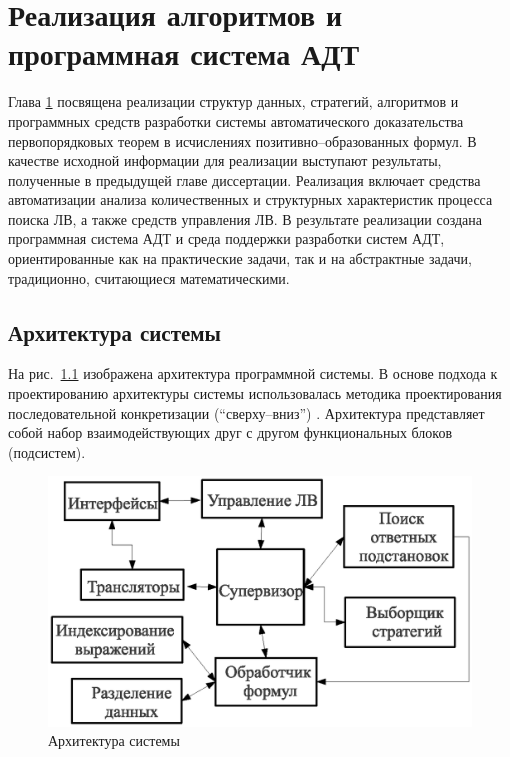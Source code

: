 \chapter{Реализация алгоритмов и программная система АДТ}\label{part:three}

Глава \ref{part:three} посвящена реализации структур данных, стратегий, алгоритмов и программных средств разработки системы автоматического доказательства первопорядковых теорем в исчислениях позитивно--образованных формул. В качестве исходной информации для реализации выступают результаты, полученные в предыдущей главе диссертации. Реализация включает средства автоматизации анализа количественных и структурных характеристик процесса поиска ЛВ, а также средств управления ЛВ. В результате реализации создана программная система АДТ и среда поддержки разработки систем АДТ, ориентированные как на практические задачи, так и на абстрактные задачи, традиционно, считающиеся математическими.



\section{Архитектура системы}
На рис.~\ref{fig:design1} изображена архитектура программной системы. В основе подхода к проектированию архитектуры системы использовалась методика проектирования последовательной конкретизации (``сверху--вниз'') \cite{yodan}. Архитектура представляет собой набор взаимодействующих друг с другом функциональных блоков (подсистем).
\begin{figure}[h]
	\centering
	\includegraphics[width=0.6\linewidth]{pics/Design1.eps}
	\caption{Архитектура системы}
	\label{fig:design1}
\end{figure}


